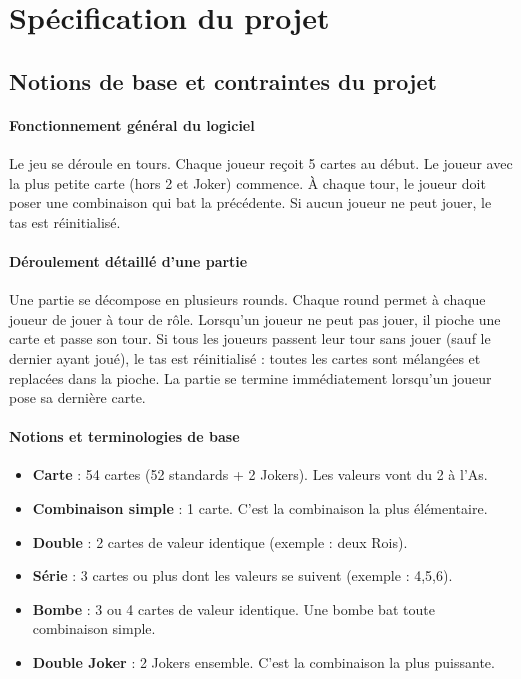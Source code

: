 \newpage
\section{Spécification du projet}
\label{sec:specification}

\subsection{Notions de base et contraintes du projet}
\label{sec:spec1}

\paragraph{Fonctionnement général du logiciel}
Le jeu se déroule en tours. Chaque joueur reçoit 5 cartes au début. 
Le joueur avec la plus petite carte (hors 2 et Joker) commence. 
À chaque tour, le joueur doit poser une combinaison qui bat la précédente. 
Si aucun joueur ne peut jouer, le tas est réinitialisé.

\paragraph{Déroulement détaillé d'une partie}
Une partie se décompose en plusieurs rounds. Chaque round permet à chaque joueur de jouer à tour de rôle. Lorsqu'un joueur ne peut pas jouer, il pioche une carte et passe son tour. Si tous les joueurs passent leur tour sans jouer (sauf le dernier ayant joué), le tas est réinitialisé : toutes les cartes sont mélangées et replacées dans la pioche. La partie se termine immédiatement lorsqu'un joueur pose sa dernière carte.

\paragraph{Notions et terminologies de base}
\begin{itemize}
\item \textbf{Carte} : 54 cartes (52 standards + 2 Jokers). Les valeurs vont du 2 à l'As.
\item \textbf{Combinaison simple} : 1 carte. C'est la combinaison la plus élémentaire.
\item \textbf{Double} : 2 cartes de valeur identique (exemple : deux Rois).
\item \textbf{Série} : 3 cartes ou plus dont les valeurs se suivent (exemple : 4,5,6).
\item \textbf{Bombe} : 3 ou 4 cartes de valeur identique. Une bombe bat toute combinaison simple.
\item \textbf{Double Joker} : 2 Jokers ensemble. C'est la combinaison la plus puissante.
\end{itemize}

